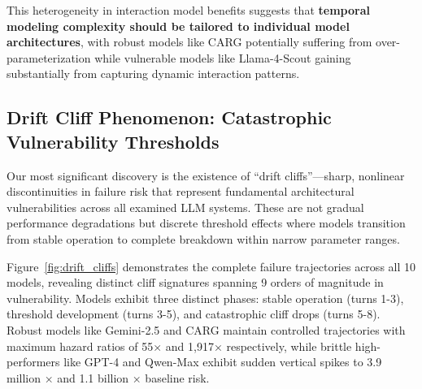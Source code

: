 \documentclass[letterpaper]{article}
\begin{document}
This heterogeneity in interaction model benefits suggests that \textbf{temporal modeling complexity should be tailored to individual model architectures}, with robust models like CARG potentially suffering from over-parameterization while vulnerable models like Llama-4-Scout gaining substantially from capturing dynamic interaction patterns.

\subsection{Drift Cliff Phenomenon: Catastrophic Vulnerability Thresholds}

Our most significant discovery is the existence of ``drift cliffs''—sharp, nonlinear discontinuities in failure risk that represent fundamental architectural vulnerabilities across all examined LLM systems. These are not gradual performance degradations but discrete threshold effects where models transition from stable operation to complete breakdown within narrow parameter ranges.

Figure~\ref{fig:drift_cliffs} demonstrates the complete failure trajectories across all 10 models, revealing distinct cliff signatures spanning 9 orders of magnitude in vulnerability. Models exhibit three distinct phases: stable operation (turns 1-3), threshold development (turns 3-5), and catastrophic cliff drops (turns 5-8). Robust models like Gemini-2.5 and CARG maintain controlled trajectories with maximum hazard ratios of 55× and 1,917× respectively, while brittle high-performers like GPT-4 and Qwen-Max exhibit sudden vertical spikes to 3.9 million × and 1.1 billion × baseline risk.
\end{document}
